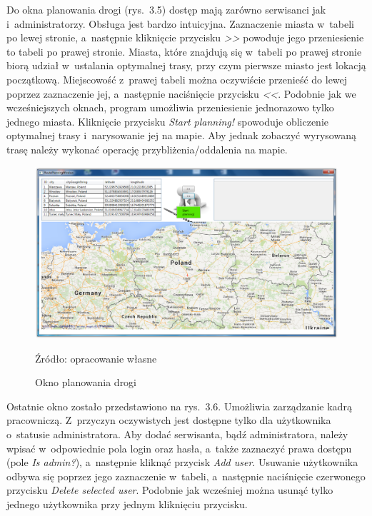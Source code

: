 \documentclass[12pt,a4paper]{report}
\begin{document}
Do okna planowania drogi (rys.~3.5) dostęp mają zarówno serwisanci jak i~administratorzy. Obsługa jest bardzo intuicyjna. Zaznaczenie miasta w~tabeli po lewej stronie, a~następnie kliknięcie przycisku \textit{>>} powoduje jego przeniesienie to tabeli po prawej stronie. Miasta, które znajdują się w~tabeli po prawej stronie biorą udział w~ustalania optymalnej trasy, przy czym pierwsze miasto jest lokacją początkową. Miejscowość z~prawej tabeli można oczywiście przenieść do lewej poprzez zaznaczenie jej, a~następnie naciśnięcie przycisku \textit{<<}. Podobnie jak we wcześniejszych oknach, program umożliwia przeniesienie jednorazowo tylko jednego miasta. Kliknięcie przycisku \textit{Start planning!} spowoduje obliczenie optymalnej trasy i~narysowanie jej na mapie. Aby jednak zobaczyć wyrysowaną trasę należy wykonać operację przybliżenia/oddalenia na mapie.

\begin{figure}[!bht]
\centering
\includegraphics[scale=0.37]{Pictures/RoutePlanning.png}
\label{fig: RoutePlanning}
\caption{Okno planowania drogi}{Źródło: opracowanie własne}
\end{figure}

Ostatnie okno zostało przedstawiono na rys.~3.6. Umożliwia zarządzanie kadrą pracowniczą. Z~przyczyn oczywistych jest dostępne tylko dla użytkownika o~statusie administratora. Aby dodać serwisanta, bądź administratora, należy wpisać w~odpowiednie pola login oraz hasła, a~także zaznaczyć prawa dostępu (pole \textit{Is admin?}), a~następnie kliknąć przycisk \textit{Add user}. Usuwanie użytkownika odbywa się poprzez jego zaznaczenie w~tabeli, a~następnie naciśnięcie czerwonego przycisku \textit{Delete selected user}. Podobnie jak wcześniej można usunąć tylko jednego użytkownika przy jednym kliknięciu przycisku. 
\end{document}
